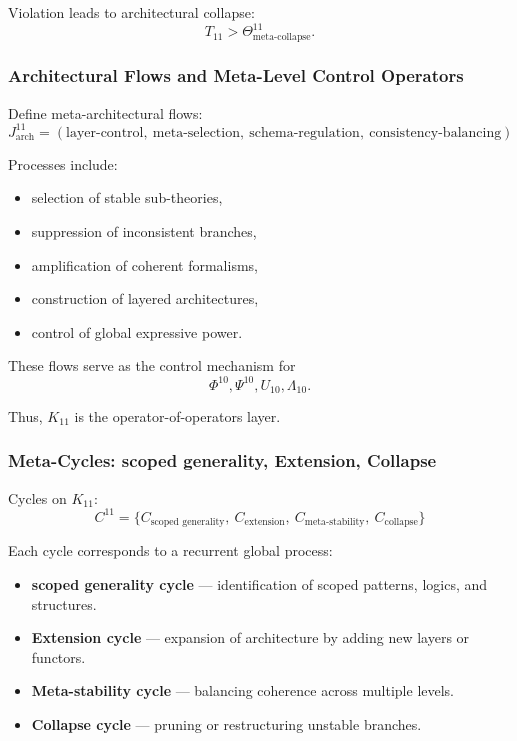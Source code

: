 Violation leads to architectural collapse:
\[
T_{11} > \Theta^{11}_{\text{meta-collapse}}.
\]

\subsubsection{Architectural Flows and Meta-Level Control Operators}

Define meta-architectural flows:
\[
J^{11}_{\text{arch}} =
(\text{layer-control},\ \text{meta-selection},\
 \text{schema-regulation},\ \text{consistency-balancing})
\]

Processes include:
\begin{itemize}
    \item selection of stable sub-theories,
    \item suppression of inconsistent branches,
    \item amplification of coherent formalisms,
    \item construction of layered architectures,
    \item control of global expressive power.
\end{itemize}

These flows serve as the control mechanism for
\[
\Phi^{10}, \Psi^{10}, U_{10}, \Lambda_{10}.
\]

Thus, $K_{11}$ is the operator-of-operators layer.

\subsubsection{Meta-Cycles: scoped generality, Extension, Collapse}

Cycles on $K_{11}$:
\[
C^{11} = \{
C_{\text{scoped generality}},\
C_{\text{extension}},\
C_{\text{meta-stability}},\
C_{\text{collapse}}
\}
\]

Each cycle corresponds to a recurrent global process:

\begin{itemize}
    \item \textbf{scoped generality cycle}
      — identification of scoped patterns, logics, and structures.

    \item \textbf{Extension cycle}
      — expansion of architecture by adding new layers or functors.

    \item \textbf{Meta-stability cycle}
      — balancing coherence across multiple levels.

    \item \textbf{Collapse cycle}
      — pruning or restructuring unstable branches.
\end{itemize}

